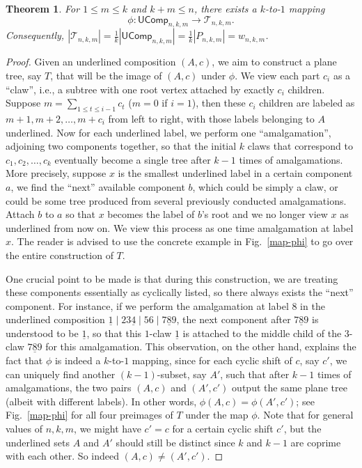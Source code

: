 \documentclass[reqno]{amsart}
\numberwithin{equation}{section}
\newtheorem{theorem}{Theorem}[section]
\theoremstyle{definition}
\theoremstyle{named}
\newcommand{\abs}[1]{\left|#1\right|}
\newcommand{\cT}{\mathcal{T}}
\def\UComp{\mathsf{UComp}}
\begin{document}
\begin{theorem}\label{thm:bij-tree-pair}
For $1 \leq m \leq k$ and $k+m\le n$, there exists a $k$-to-$1$ mapping $$\phi: \UComp_{n,k,m} \to \cT_{n,k,m}.$$
Consequently, $\abs{\cT_{n,k,m}}=\frac{1}{k}\abs{\UComp_{n,k,m}}=\frac{1}{k}\abs{P_{n,k,m}}=w_{n,k,m}$.
\end{theorem}
\begin{proof}
Given an underlined composition $(A,c)$, we aim to construct a plane tree, say $T$, that will be the image of $(A,c)$ under $\phi$. We view each part $c_i$ as a ``claw'', i.e., a subtree with one root vertex attached by exactly $c_i$ children. Suppose $m=\sum_{1\le t\le i-1}c_t$ ($m=0$ if $i=1$), then these $c_i$ children are labeled as $m+1,m+2,\ldots,m+c_i$ from left to right, with those labels belonging to $A$ underlined. Now for each underlined label, we perform one ``amalgamation'', adjoining two components together, so that the initial $k$ claws that correspond to $c_1,c_2,\ldots,c_k$ eventually become a single tree after $k-1$ times of amalgamations. More precisely, suppose $x$ is the smallest underlined label in a certain component $a$, we find the ``next'' available component $b$, which could be simply a claw, or could be some tree produced from several previously conducted amalgamations. Attach 
$b$ to $a$ so that $x$ becomes the label of $b$'s root and we no longer view $x$ as underlined from now on. We view this process as one time amalgamation at label $x$. The reader is advised to use the concrete example in Fig.~\ref{map-phi} to go over the entire construction of $T$.

One crucial point to be made is that during this construction, we are treating these components essentially as cyclically listed, so there always exists the ``next'' component. For instance, if we perform the amalgamation at label $8$ in the underlined composition $\underline{1}\mid 23\underline{4}\mid 56\mid 7\underline{8}9$, the next component after $7\underline{8}9$ is understood to be $\underline{1}$, so that this $1$-claw $\underline{1}$ is attached to the middle child of the $3$-claw $7\underline{8}9$ for this amalgamation. This observation, on the other hand, explains the fact that $\phi$ is indeed a $k$-to-$1$ mapping, since for each cyclic shift of $c$, say $c'$, we can uniquely find another $(k-1)$-subset, say $A'$, such that after $k-1$ times of amalgamations, the two pairs $(A,c)$ and $(A',c')$ output the same plane tree (albeit with different labels). In other words, $\phi(A,c)=\phi(A',c')$; see Fig.~\ref{map-phi} for all four preimages of $T$ under the map $\phi$. Note that for general values of $n,k,m$, we might have $c'=c$ for a certain cyclic shift $c'$, but the underlined sets $A$ and $A'$ should still be distinct since $k$ and $k-1$ are coprime with each other. So indeed $(A,c)\neq(A',c')$. 


\end{proof}
\end{document}
